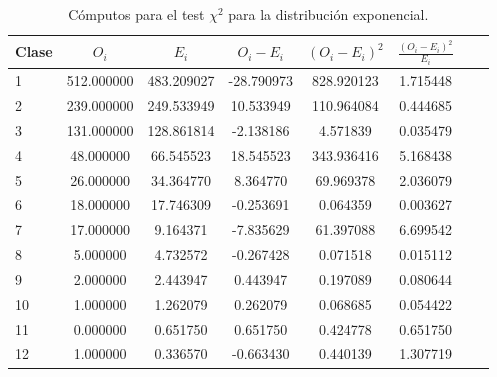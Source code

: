 \documentclass[a4paper,10pt]{article}
\begin{document}
\begin{table}[ht]
\begin{center}
\begin{tabular}{l*{6}{c}r}
\hline
Clase& $O_i$ & $E_i$  & $O_i - E_i$ & $(O_i - E_i)^2$ & $\frac{(O_i - E_i)^2}{E_i}$\\
\hline
1&512.000000&483.209027&-28.790973&828.920123&1.715448\\
2&239.000000&249.533949&10.533949&110.964084&0.444685\\
3&131.000000&128.861814&-2.138186&4.571839&0.035479\\
4&48.000000&66.545523&18.545523&343.936416&5.168438\\
5&26.000000&34.364770&8.364770&69.969378&2.036079\\
6&18.000000&17.746309&-0.253691&0.064359&0.003627\\
7&17.000000&9.164371&-7.835629&61.397088&6.699542\\
8&5.000000&4.732572&-0.267428&0.071518&0.015112\\
9&2.000000&2.443947&0.443947&0.197089&0.080644\\
10&1.000000&1.262079&0.262079&0.068685&0.054422\\
11&0.000000&0.651750&0.651750&0.424778&0.651750\\
12&1.000000&0.336570&-0.663430&0.440139&1.307719\\
\hline
\end{tabular}
\caption{\label{tab:chi_table} Cómputos para el test $\chi^2$ para la distribución exponencial.}
\end{center}
\end{table}

\end{document}
